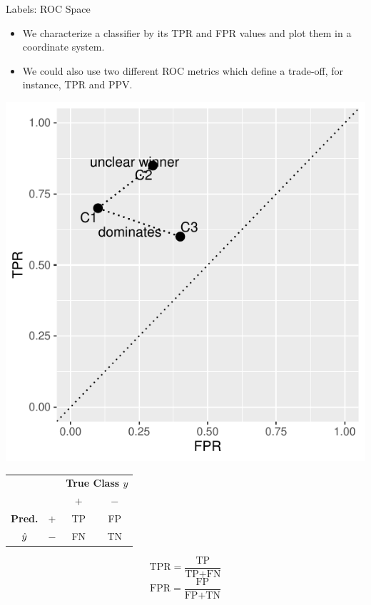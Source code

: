\begin{vbframe}{Labels: ROC Space}

\begin{itemize}
 \item We characterize a classifier by its TPR and FPR values and plot them in 
 a coordinate system.
 \item We could also use two different ROC metrics which define a trade-off, 
 for instance, TPR and PPV.
\end{itemize}

\lz

\begin{minipage}[c]{0.5\textwidth}
  \begin{knitrout}
    \scriptsize
    \color{fgcolor}
    {\centering \includegraphics[width=\textwidth]{figure/eval_mclass_roc_sp_1}}
  \end{knitrout}
\end{minipage}%
\begin{minipage}[c]{0.5\textwidth}
\begin{center}
  \small
  \begin{tabular}{cc|cc}
    & & \multicolumn{2}{c}{\bfseries True Class $y$} \\
    & & $+$ & $-$ \\
    \hline
    \bfseries Pred.     & $+$ & TP & FP \\
              $\hat{y}$ & $-$ & FN & TN \\
\end{tabular}
\lz
$$\text{TPR} = \frac{\text{TP}}{\text{TP} + \text{FN}}$$
$$\text{FPR} = \frac{\text{FP}}{\text{FP} + \text{TN}}$$
\end{center}
\end{minipage}

\end{vbframe}

